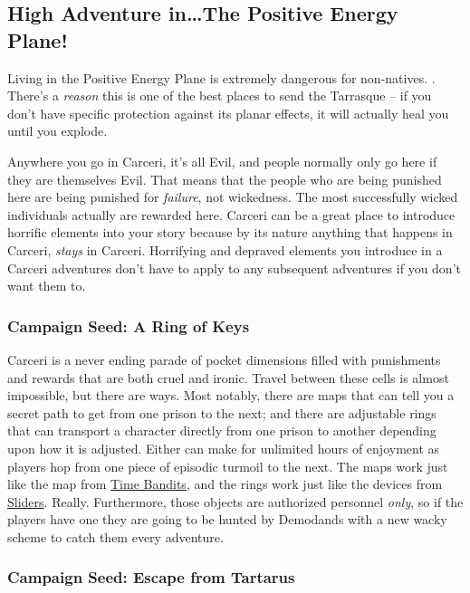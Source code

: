 \subsection{High Adventure in\ldots The Positive Energy Plane!}

Living in the Positive Energy Plane is extremely dangerous for non-natives. . There's a \emph{reason} this is one of the best places to send the Tarrasque -- if you don't have specific protection against its planar effects, it will actually heal you until you explode.

Anywhere you go in Carceri, it's all Evil, and people normally only go here if they are themselves Evil. That means that the people who are being punished here are being punished for \textit{failure}, not wickedness. The most successfully wicked individuals actually are rewarded here. Carceri can be a great place to introduce horrific elements into your story because by its nature anything that happens in Carceri, \textit{stays} in Carceri. Horrifying and depraved elements you introduce in a Carceri adventures don't have to apply to any subsequent adventures if you don't want them to.

\subsubsection{Campaign Seed: A Ring of Keys}

Carceri is a never ending parade of pocket dimensions filled with punishments and rewards that are both cruel and ironic. Travel between these cells is almost impossible, but there are ways. Most notably, there are maps that can tell you a secret path to get from one prison to the next; and there are adjustable rings that can transport a character directly from one prison to another depending upon how it is adjusted. Either can make for unlimited hours of enjoyment as players hop from one piece of episodic turmoil to the next. The maps work just like the map from \underline{Time Bandits}, and the rings work just like the devices from \underline{Sliders}. Really. Furthermore, those objects are authorized personnel \textit{only}, so if the players have one they are going to be hunted by Demodands with a new wacky scheme to catch them every adventure.

\subsubsection{Campaign Seed: Escape from Tartarus}

